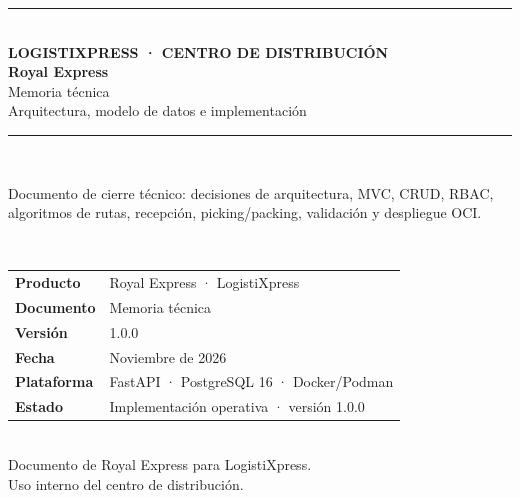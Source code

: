 \renewcommand{\docshorttitle}{Royal Express · Memoria técnica}
\renewcommand{\doctitle}{Royal Express}
\renewcommand{\docsubtitle}{Memoria técnica de Royal Express · sistema de gestión logística para LogistiXpress}
\renewcommand{\docversion}{1.0.0}
\renewcommand{\docdate}{Noviembre de 2026}
\begin{titlepage}
  \thispagestyle{empty}
  \centering
  \vspace*{1.8cm}
  {\color{RoyalOrange}\rule{\linewidth}{2.4pt}}\\[0.45cm]
  {\footnotesize\bfseries\color{RoyalGray}LOGISTIXPRESS · CENTRO DE DISTRIBUCIÓN}\\[0.35cm]
  {\Huge\bfseries\color{RoyalNavy} Royal Express}\\[0.25cm]
  {\Large\color{RoyalNavy} Memoria técnica}\\[0.1cm]
  {\large\color{RoyalGray} Arquitectura, modelo de datos e implementación}\\[0.45cm]
  {\color{RoyalOrange}\rule{\linewidth}{1pt}}\\[1.4cm]
  \begin{minipage}{0.86\linewidth}
    \centering
    {\large\color{RoyalGray} Documento de cierre técnico: decisiones de arquitectura, MVC, CRUD,
    RBAC, algoritmos de rutas, recepción, picking/packing, validación y despliegue OCI.}
  \end{minipage}\\[2.2cm]
  \begin{tabular}{@{}ll@{}}
    \textbf{Producto} & Royal Express · LogistiXpress \\
    \textbf{Documento} & Memoria técnica \\
    \textbf{Versión} & \docversion \\
    \textbf{Fecha} & \docdate \\
    \textbf{Plataforma} & FastAPI · PostgreSQL 16 · Docker/Podman \\
    \textbf{Estado} & Implementación operativa · versión 1.0.0 \\
  \end{tabular}\\[2.4cm]
  \vfill
  {\footnotesize\color{RoyalGray} Documento de Royal Express para LogistiXpress.\\
  Uso interno del centro de distribución.}
\end{titlepage}
\tableofcontents
\newpage
